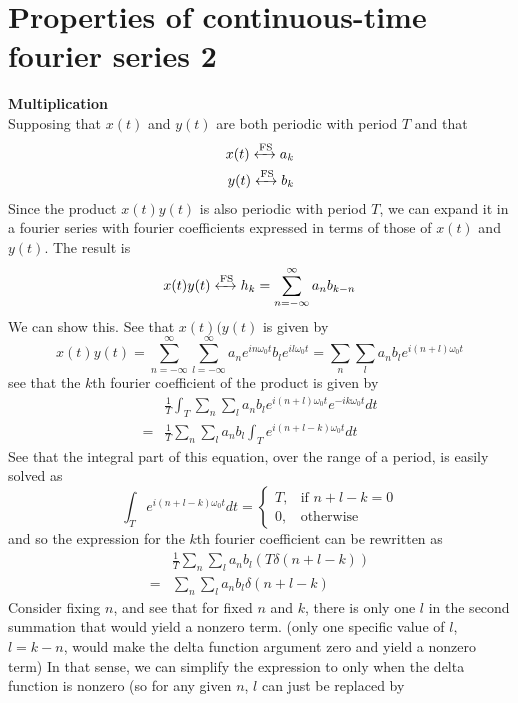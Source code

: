 \documentclass{report}
\begin{document}
\section{Properties of continuous-time fourier series 2}
\textbf{Multiplication}\\
Supposing that $x(t)$ and $y(t)$ are both periodic with period $T$ and that 
\begin{align*}
x(t)\xleftrightarrow[]{\text{FS}}a_k\\
y(t)\xleftrightarrow[]{\text{FS}}b_k
\end{align*}
Since the product $x(t)y(t)$ is also periodic with period $T$, we can expand it in a fourier series with fourier coefficients expressed in terms of those of $x(t)$ and $y(t)$. The result is
\begin{equation*}
x(t)y(t)\xleftrightarrow[]{\text{FS}}h_k=\sum^\infty_{n=-\infty}a_nb_{k-n}
\end{equation*}
We can show this. See that $x(t)(y(t)$ is given by
\begin{equation*}
x(t)y(t)=\sum^\infty_{n=-\infty}\sum^\infty_{l=-\infty}a_ne^{in\omega_0t}b_le^{il\omega_0t}
=\sum_n\sum_la_nb_le^{i(n+l)\omega_0t}
\end{equation*}
see that the $k$th fourier coefficient of the product is given by
\begin{align*}
&\frac{1}{T}\int_T\sum_n\sum_la_nb_le^{i(n+l)\omega_0t}e^{-ik\omega_0t}dt\\
=&\frac{1}{T}\sum_n\sum_la_nb_l\int_Te^{i(n+l-k)\omega_0t}dt
\end{align*}
See that the integral part of this equation, over the range of a period, is easily solved as
\begin{equation*}
\int_Te^{i(n+l-k)\omega_0t}dt=\begin{cases}
T,&\text{if }n+l-k=0\\
0,&\text{otherwise}\end{cases}
\end{equation*}
and so the expression for the $k$th fourier coefficient can be rewritten as
\begin{align*}
&\frac{1}{T}\sum_n\sum_la_nb_l(T\delta(n+l-k))\\
=&\sum_n\sum_la_nb_l\delta(n+l-k)
\end{align*}
Consider fixing $n$, and see that for fixed $n$ and $k$, there is only one $l$ in the second summation that would yield a nonzero term. (only one specific value of $l$, $l=k-n$, would make the delta
function argument zero and yield a nonzero term) In that sense, we can simplify the expression to only when the delta function is nonzero (so for any given $n$, $l$ can just be replaced by
\end{document}

